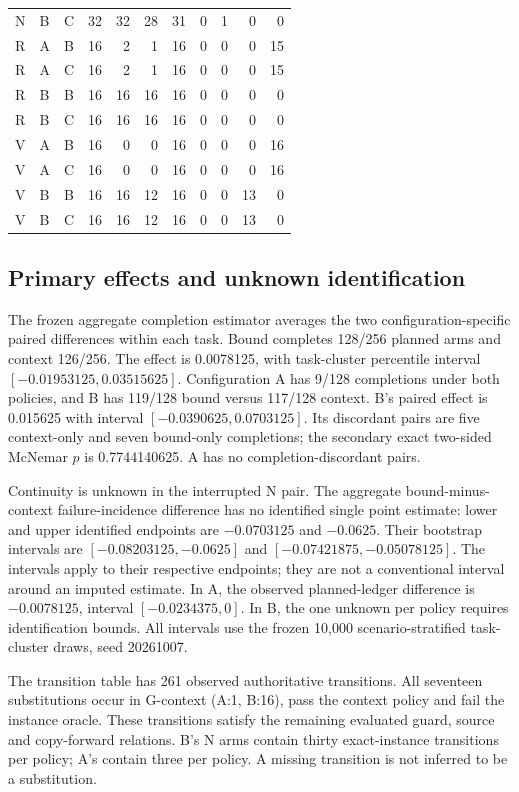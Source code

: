 \documentclass[11pt,a4paper]{article}
\begin{document}
\begin{longtable}{@{}lllrrrrrrrr@{}}
N & B & C & 32 & 32 & 28 & 31 & 0 & 1 & 0 & 0 \\
R & A & B & 16 & 2 & 1 & 16 & 0 & 0 & 0 & 15 \\
R & A & C & 16 & 2 & 1 & 16 & 0 & 0 & 0 & 15 \\
R & B & B & 16 & 16 & 16 & 16 & 0 & 0 & 0 & 0 \\
R & B & C & 16 & 16 & 16 & 16 & 0 & 0 & 0 & 0 \\
V & A & B & 16 & 0 & 0 & 16 & 0 & 0 & 0 & 16 \\
V & A & C & 16 & 0 & 0 & 16 & 0 & 0 & 0 & 16 \\
V & B & B & 16 & 16 & 12 & 16 & 0 & 0 & 13 & 0 \\
V & B & C & 16 & 16 & 12 & 16 & 0 & 0 & 13 & 0 \\
\bottomrule\end{longtable}

\subsection{Primary effects and unknown identification}
The frozen aggregate completion estimator averages the two configuration-specific paired differences within each task. Bound completes 128/256 planned arms and context 126/256. The effect is 0.0078125, with task-cluster percentile interval $[-0.01953125,0.03515625]$. Configuration A has 9/128 completions under both policies, and B has 119/128 bound versus 117/128 context. B's paired effect is 0.015625 with interval $[-0.0390625,0.0703125]$. Its discordant pairs are five context-only and seven bound-only completions; the secondary exact two-sided McNemar $p$ is 0.7744140625. A has no completion-discordant pairs.

Continuity is unknown in the interrupted N pair. The aggregate bound-minus-context failure-incidence difference has no identified single point estimate: lower and upper identified endpoints are $-0.0703125$ and $-0.0625$. Their bootstrap intervals are $[-0.08203125,-0.0625]$ and $[-0.07421875,-0.05078125]$. The intervals apply to their respective endpoints; they are not a conventional interval around an imputed estimate. In A, the observed planned-ledger difference is $-0.0078125$, interval $[-0.0234375,0]$. In B, the one unknown per policy requires identification bounds. All intervals use the frozen 10,000 scenario-stratified task-cluster draws, seed 20261007.

The transition table has 261 observed authoritative transitions. All seventeen substitutions occur in G-context (A:1, B:16), pass the context policy and fail the instance oracle. These transitions satisfy the remaining evaluated guard, source and copy-forward relations. B's N arms contain thirty exact-instance transitions per policy; A's contain three per policy. A missing transition is not inferred to be a substitution.
\end{document}
